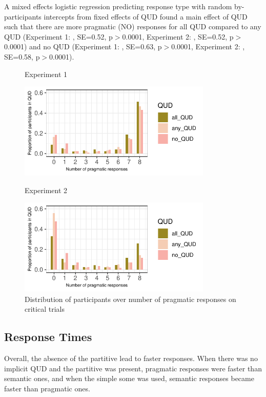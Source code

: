 \documentclass[12pt]{article}
\begin{document}
 A mixed effects logistic regression predicting response type with random by-participants intercepts from fixed effects of QUD found a main effect of QUD such that there are more pragmatic (NO) responses for all QUD compared to any QUD (Experiment 1: , SE=0.52, p$>$0.0001, Experiment 2: , SE=0.52, p$>$0.0001) and no QUD (Experiment 1: , SE=0.63, p$>$0.0001, Experiment 2: , SE=0.58, p$>$0.0001).

\begin{figure}[!ht] 
    \begin{minipage}{.5\textwidth}
    \caption*{Experiment 1}
    \includegraphics[height=4.6cm]{img/exp4_pragmatic_proportion.pdf}
    \end{minipage}%
    \begin{minipage}{.5\textwidth}
    \caption*{Experiment 2}
    \includegraphics[height=4.6cm]{img/exp5_pragmatic_proportion.pdf}
    \end{minipage}%
    \caption{Distribution of participants over number of pragmatic responses on critical trials}
\end{figure}

\subsection*{Response Times}

Overall, the absence of the partitive lead to faster responses. When there was no implicit QUD and the partitive was present, pragmatic responses were faster than semantic ones, and when the simple some was used, semantic responses became faster than pragmatic ones. 
\end{document}
